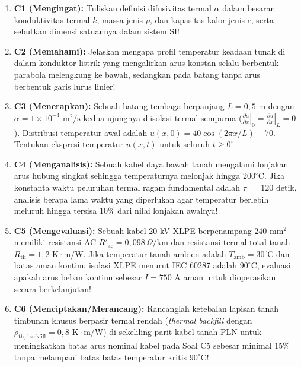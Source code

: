 \documentclass[11pt,a4paper]{article}
\theoremstyle{definition}
\begin{document}
\begin{enumerate}[leftmargin=*]
    \item \textbf{C1 (Mengingat):} 
    Tuliskan definisi difusivitas termal $\alpha$ dalam besaran konduktivitas termal $k$, massa jenis $\rho$, dan kapasitas kalor jenis $c$, serta sebutkan dimensi satuannya dalam sistem SI!
    
    \item \textbf{C2 (Memahami):} 
    Jelaskan mengapa profil temperatur keadaan tunak di dalam konduktor listrik yang mengalirkan arus konstan selalu berbentuk parabola melengkung ke bawah, sedangkan pada batang tanpa arus berbentuk garis lurus linier!
    
    \item \textbf{C3 (Menerapkan):} 
    Sebuah batang tembaga berpanjang $L = 0{,}5\text{ m}$ dengan $\alpha = 1 \times 10^{-4}\text{ m}^2/\text{s}$ kedua ujungnya diisolasi termal sempurna ($\left.\frac{\partial u}{\partial x}\right|_{0} = \left.\frac{\partial u}{\partial x}\right|_{L} = 0$). Distribusi temperatur awal adalah $u(x, 0) = 40 \cos(2\pi x / L) + 70$. Tentukan ekspresi temperatur $u(x, t)$ untuk seluruh $t \ge 0$!
    
    \item \textbf{C4 (Menganalisis):} 
    Sebuah kabel daya bawah tanah mengalami lonjakan arus hubung singkat sehingga temperaturnya melonjak hingga $200^\circ\text{C}$. Jika konstanta waktu peluruhan termal ragam fundamental adalah $\tau_1 = 120\text{ detik}$, analisis berapa lama waktu yang diperlukan agar temperatur berlebih meluruh hingga tersisa $10\%$ dari nilai lonjakan awalnya!
    
    \item \textbf{C5 (Mengevaluasi):} 
    Sebuah kabel 20 kV XLPE berpenampang $240\text{ mm}^2$ memiliki resistansi AC $R'_{\text{ac}} = 0{,}098\,\Omega/\text{km}$ dan resistansi termal total tanah $R_{\text{th}} = 1{,}2\text{ K}\cdot\text{m}/\text{W}$. Jika temperatur tanah ambien adalah $T_{\text{amb}} = 30^\circ\text{C}$ dan batas aman kontinu isolasi XLPE menurut IEC 60287 adalah $90^\circ\text{C}$, evaluasi apakah arus beban kontinu sebesar $I = 750\text{ A}$ aman untuk dioperasikan secara berkelanjutan!
    
    \item \textbf{C6 (Menciptakan/Merancang):} 
    Rancanglah ketebalan lapisan tanah timbunan khusus berpasir termal rendah (\textit{thermal backfill} dengan $\rho_{\text{th, backfill}} = 0{,}8\text{ K}\cdot\text{m}/\text{W}$) di sekeliling parit kabel tanah PLN untuk meningkatkan batas arus nominal kabel pada Soal C5 sebesar minimal $15\%$ tanpa melampaui batas batas temperatur kritis $90^\circ\text{C}$!
\end{enumerate}
\end{document}
